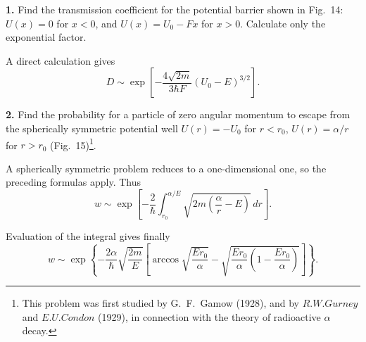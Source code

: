 \begin{center}\ProblemHeading\end{center}

\textbf{1.} Find the transmission coefficient for the potential barrier shown
in Fig.~14: $U(x)=0$ for $x<0$, and $U(x)=U_0-Fx$ for $x>0$. Calculate only
the exponential factor.

\SolutionHeading A direct calculation gives
\[
 D\sim\exp\left[-\frac{4\sqrt{2m}}{3\hbar F}(U_0-E)^{3/2}\right].
\]

\textbf{2.} Find the probability for a particle of zero angular momentum to
escape from the spherically symmetric potential well $U(r)=-U_0$ for $r<r_0$,
$U(r)=\alpha/r$ for $r>r_0$ (Fig.~15)\footnote{This problem was first studied
by G.~F.~Gamow (1928), and by $R. W. Gurney$ and $E. U. Condon$ (1929), in
connection with the theory of radioactive $\alpha$ decay.}.

\SolutionHeading A spherically symmetric problem reduces to a one-dimensional
one, so the preceding formulas apply. Thus
\[
 w\sim\exp\left[-\frac2\hbar\int_{r_0}^{\alpha/E}
 \sqrt{2m\left(\frac\alpha r-E\right)}\,dr\right].
\]

Evaluation of the integral gives finally
\[
 w\sim\exp\left\{-\frac{2\alpha}{\hbar}\sqrt{\frac{2m}{E}}
 \left[\arccos\sqrt{\frac{Er_0}{\alpha}}-
 \sqrt{\frac{Er_0}{\alpha}\left(1-\frac{Er_0}{\alpha}\right)}\right]\right\}.
\]

\begin{figure}[ht]
\centering
{}
\end{figure}

